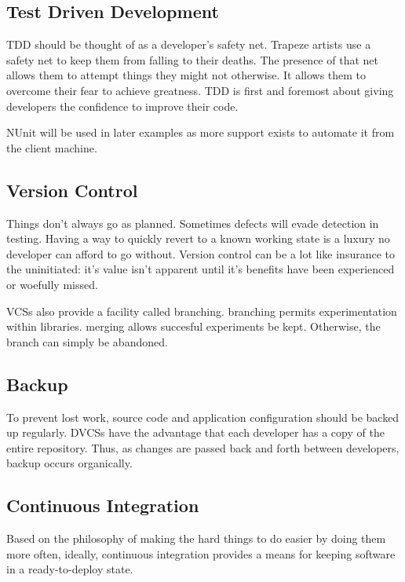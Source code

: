 \subsection{Test Driven Development}

\gls{TDD} should be thought of as a developer's safety net. Trapeze artists use a safety net to keep them from falling to their deaths. The presence
of that net allows them to attempt things they might not otherwise. It allows them to overcome their fear to achieve greatness. \gls{TDD} is first 
and foremost about giving developers the confidence to improve their code.

\gls{NUnit} will be used in later examples as more support exists to automate it from the client machine.

\subsection{Version Control}
Things don't always go as planned. Sometimes defects will evade detection in testing. Having a way to quickly revert to a known working state is a 
luxury no developer can afford to go without. Version control can be a lot like insurance to the uninitiated: it's value isn't apparent until it's benefits have been experienced or woefully missed.

\glspl{VCS} also provide a facility called branching. \Gls{branching} permits experimentation within libraries. \Gls{merging} allows succesful 
experiments be kept. Otherwise, the branch can simply be abandoned. 

\subsection{Backup}
To prevent lost work, source code and application configuration should be backed up regularly. \glspl{DVCS} have the advantage that each developer 
has a copy of the entire repository. Thus, as changes are passed back and forth between developers, backup occurs organically.

\subsection{Continuous Integration}
Based on the philosophy of making the hard things to do easier by doing them more often, ideally, continuous integration provides a means for 
keeping software in a ready-to-deploy state.

